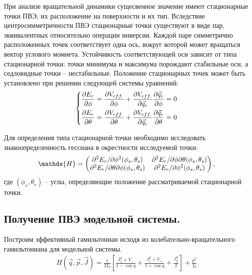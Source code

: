 При анализе вращательной динамики сущесвенное значение имеют стационарные точки ПВЭ, их расположение на поверхности и их тип. Вследствие центросимметричности ПВЭ стационарные точки существуют в виде пар, эквивалентных относительно операции инверсии. Каждой паре симметрично расположенных точек соответствует одна ось, вокруг которой может вращаться вектор углового момнета. Устойчивость соответствующей оси зависит от типа стационарной точки: точки минимума и максимума порождают стабильные оси, а седловидные точки -- нестабильные. Положение стационарных точек может быть установлено при решении следующей системы уравнений:
\vverh
\begin{gather}
\left\{
\begin{aligned}
\frac{\partial E_r}{\partial \phi} = \frac{\partial V_{eff.}}{\partial \phi} + \frac{\partial V_{eff.}}{\partial \vec{q}_e} \frac{\partial \vec{q}_e}{\partial \phi} = 0 \\
\frac{\partial E_r}{\partial \theta} = \frac{\partial V_{eff.}}{\partial \theta} + \frac{\partial V_{eff.}}{\partial \vec{q}_e} \frac{\partial \vec{q}_e}{\partial \theta} = 0
\end{aligned}
\right. \notag
\end{gather}

Для определения типа стационарной точки необходимо исследовать знакоопределенность гессиана в окрестности исследуемой точки: 
\vverh
\begin{gather}
\mathds{H} = \begin{pmatrix}
\partial^2 E_r / \partial \phi^2 (\phi_s, \theta_s) & \partial^2 E_r / \partial \phi \partial \theta (\phi_s, \theta_s) \\
\partial^2 E_r / \partial \theta \partial \phi (\phi_s, \theta_s) & \partial^2 E_r / \partial \phi^2 (\phi_s, \theta_s)
\end{pmatrix}, \notag
\end{gather}
\vlevo где $(\phi_s, \theta_s)$ -- углы, определяющие положение рассматриваемой стационарной точки.

\subsection{Получение ПВЭ модельной системы.}

Построим эффективный гамильтониан исходя из колебательно-вращательного гамильтониана для модельной системы. 
\vverh
\begin{gather}
H(\vec{q}, \vec{p}, \vec{J}) = \frac{1}{2I_0} \left[ \frac{J_x^2 + V_{-}}{1-\cos q} + \frac{J_z^2 + V_{+}}{1 + \cos q} + \frac{J_y^2}{2} \right] + \frac{p^2}{I_0} \label{model_ham}
\end{gather}

